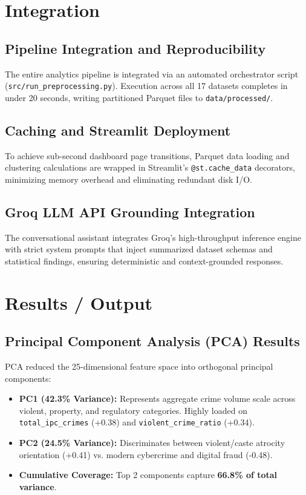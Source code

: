 \documentclass[12pt,a4paper]{report}
\begin{document}
\chapter{Integration}

\section{Pipeline Integration and Reproducibility}
The entire analytics pipeline is integrated via an automated orchestrator script (\texttt{src/run_preprocessing.py}). Execution across all 17 datasets completes in under 20 seconds, writing partitioned Parquet files to \texttt{data/processed/}.

\section{Caching and Streamlit Deployment}
To achieve sub-second dashboard page transitions, Parquet data loading and clustering calculations are wrapped in Streamlit's \texttt{@st.cache\_data} decorators, minimizing memory overhead and eliminating redundant disk I/O.

\section{Groq LLM API Grounding Integration}
The conversational assistant integrates Groq's high-throughput inference engine with strict system prompts that inject summarized dataset schemas and statistical findings, ensuring deterministic and context-grounded responses.

\chapter{Results / Output}

\section{Principal Component Analysis (PCA) Results}
PCA reduced the 25-dimensional feature space into orthogonal principal components:
\begin{itemize}[leftmargin=*]
    \item \textbf{PC1 (42.3\% Variance):} Represents aggregate crime volume scale across violent, property, and regulatory categories. Highly loaded on \texttt{total\_ipc\_crimes} (+0.38) and \texttt{violent\_crime\_ratio} (+0.34).
    \item \textbf{PC2 (24.5\% Variance):} Discriminates between violent/caste atrocity orientation (+0.41) vs. modern cybercrime and digital fraud (-0.48).
    \item \textbf{Cumulative Coverage:} Top 2 components capture \textbf{66.8\% of total variance}.
\end{itemize}
\end{document}

